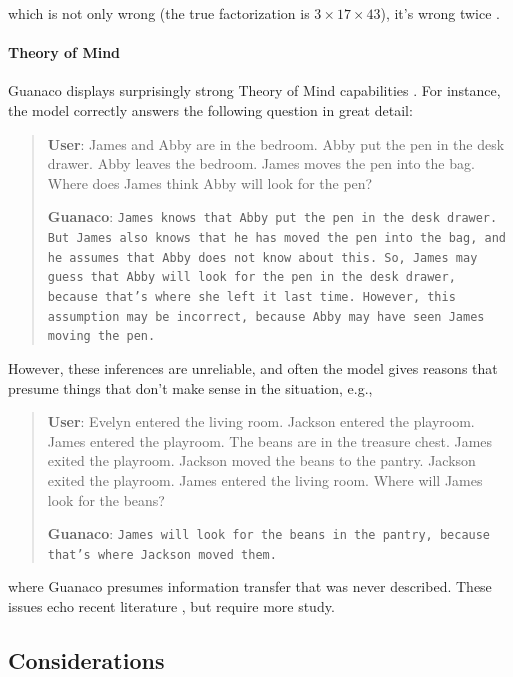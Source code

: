 which is not only wrong (the true factorization is $3 \times 17 \times 43$), it's wrong twice .

\paragraph{Theory of Mind} {Guanaco} displays surprisingly strong Theory of Mind capabilities \cite{nematzadeh2018evaluating, sap2022neural}. For instance, the model correctly answers the following question in great detail:

\begin{quote}
    \textbf{User}: James and Abby are in the bedroom. Abby put the pen in the desk drawer. Abby leaves the bedroom. James moves the pen into the bag. Where does James think Abby will look for the pen?

    \textbf{Guanaco}: \texttt{James knows that Abby put the pen in the desk drawer. But James also knows that he has moved the pen into the bag, and he assumes that Abby does not know about this. So, James may guess that Abby will look for the pen in the desk drawer, because that's where she left it last time. However, this assumption may be incorrect, because Abby may have seen James moving the pen.}
\end{quote}

However, these inferences are unreliable, and often the model gives reasons that presume things that don't make sense in the situation, e.g.,

\begin{quote}
    \textbf{User}: Evelyn entered the living room. Jackson entered the playroom. James entered the playroom. The beans are in the treasure chest. James exited the playroom. Jackson moved the beans to the pantry. Jackson exited the playroom. James entered the living room. Where will James look for the beans?

    \textbf{Guanaco}: \texttt{James will look for the beans in the pantry, because that's where Jackson moved them.}
\end{quote}

where {Guanaco} presumes information transfer that was never described. These issues echo recent literature \cite{sap2022neural}, but require more study.

\subsection{Considerations}
\label{ssec:considerations}

